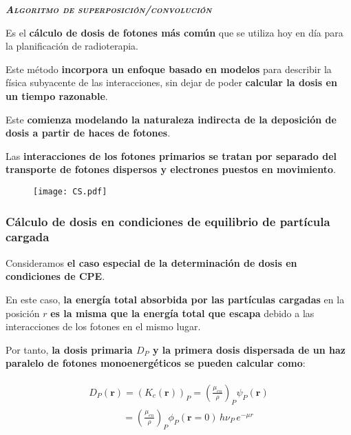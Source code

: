 \documentclass[aspectratio=169,xcolor=dvipsnames,t]{beamer}
\newcommand{\bae}{\begin{eqnarray}}
\newcommand{\eae}{\end{eqnarray}}
\newcommand{\pl}{\left(}
\newcommand{\pr}{\right)}
\begin{document}


\begin{frame}[standout]
    \centering\LARGE
    \textbf{\itshape\scshape Algoritmo de superposición/convolución}
\end{frame}

\begin{frame}

    Es el \textbf{cálculo de dosis de fotones más común} que se utiliza hoy en día para la planificación de radioterapia.

    Este método \textbf{incorpora un enfoque basado en modelos} para describir la física subyacente de las interacciones, sin dejar de poder \textbf{calcular la dosis en un tiempo razonable}.

    Este \textbf{comienza modelando la naturaleza indirecta de la deposición de dosis a partir de haces de fotones}.
    
    Las \textbf{interacciones de los fotones primarios se tratan por separado del transporte de fotones dispersos y electrones puestos en movimiento}.

    \begin{figure}
        \centering
        \texttt{[image: CS.pdf]}
    \end{figure}

\end{frame}

\begin{frame}

    \frametitle{Cálculo de dosis en condiciones de equilibrio de partícula cargada}

    Consideramos \textbf{el caso especial de la determinación de dosis en condiciones de CPE}. 

    En este caso, \textbf{la energía total absorbida por las partículas cargadas} en la posición $r$ \textbf{es la misma que la energía total que escapa} debido a las interacciones de los fotones en el mismo lugar.

    Por tanto, \textbf{la dosis primaria $D_P$ y la primera dosis dispersada de un haz paralelo de fotones monoenergéticos se pueden calcular como}:

    \bae \label{Dp}
    \begin{split}
    D_P(\mathbf{r}) = \pl K_c(\mathbf{r}) \pr_P = \pl \frac{\mu_{en}}{\rho} \pr_P \psi_{P} (\mathbf{r}) \\
    \quad \quad \quad \, \, \, = \pl \frac{\mu_{en}}{\rho} \pr_P \phi_{P} (\mathbf{r}=0) \, h\nu_P \, e^{-\mu r}
    \end{split}
    \eae
    
\end{frame}
\end{document}
